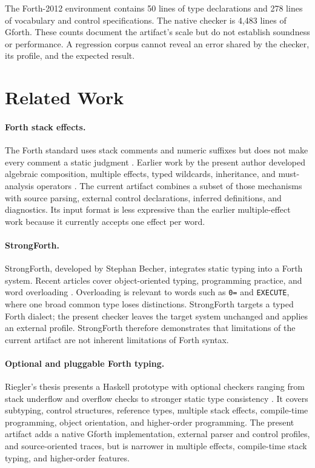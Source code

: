 \documentclass[11pt,a4paper]{article}
\begin{document}
The Forth-2012 environment contains 50 lines of type declarations and 278
lines of vocabulary and control specifications.  The native checker is 4,483
lines of Gforth.  These counts document the artifact's scale but do not establish soundness or
performance.  A regression corpus cannot reveal an error shared by the
checker, its profile, and the expected result.

\section{Related Work}
\label{sec:related}

\paragraph{Forth stack effects.}
The Forth standard uses stack comments and numeric suffixes but does not make
every comment a static judgment \cite{forth2012,rather1996}.  Earlier work by
the present author developed algebraic composition, multiple effects, typed
wildcards, inheritance, and must-analysis operators
\cite{poial1991,poial1992,poial1994,poial2002,poial2006}.  The current artifact
combines a subset of those mechanisms with source parsing, external control
declarations, inferred definitions, and diagnostics.  Its input format is less
expressive than the earlier multiple-effect work because it currently accepts
one effect per word.

\paragraph{StrongForth.}
StrongForth, developed by Stephan Becher, integrates static typing into a Forth
system.  Recent articles cover object-oriented typing, programming practice,
and word overloading
\cite{becher2025objects,becher2025practice,becher2025overloading}.  Overloading
is relevant to words such as \texttt{0=} and \texttt{EXECUTE}, where one broad
common type loses distinctions.  StrongForth targets a typed Forth dialect;
the present checker leaves the target system unchanged and applies an
external profile.  StrongForth therefore demonstrates that limitations of the
current artifact are not inherent limitations of Forth syntax.

\paragraph{Optional and pluggable Forth typing.}
Riegler's thesis presents a Haskell prototype with optional checkers ranging
from stack underflow and overflow checks to stronger static type consistency
\cite{riegler2015}.  It covers subtyping, control structures, reference types,
multiple stack effects, compile-time programming, object orientation, and
higher-order programming.  The present artifact adds a native Gforth
implementation, external parser and control profiles, and source-oriented
traces, but is narrower in multiple effects, compile-time stack typing, and
higher-order features.
\end{document}

